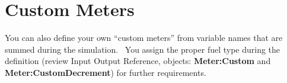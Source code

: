 \section{Custom Meters}\label{custom-meters}

You can also define your own ``custom meters'' from variable names that are summed during the simulation.~ You assign the proper fuel type during the definition (review Input Output Reference, objects: \textbf{Meter:Custom} and \textbf{Meter:CustomDecrement}) for further requirements.
